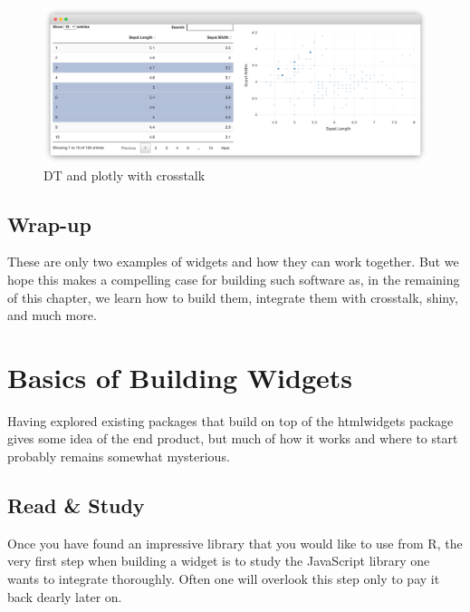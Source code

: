\documentclass[
]{krantz}
\begin{document}
\begin{figure}[t]

{\centering \includegraphics[width=1\linewidth]{images/dt-crosstalk-intro} 

}

\caption{DT and plotly with crosstalk}\label{fig:dt-example-crosstalk}
\end{figure}

\hypertarget{widgets-intro-conclude}{%
\section{Wrap-up}\label{widgets-intro-conclude}}

These are only two examples of widgets and how they can work together. But we hope this makes a compelling case for building such software as, in the remaining of this chapter, we learn how to build them, integrate them with crosstalk, shiny, and much more.

\hypertarget{widgets-basics}{%
\chapter{Basics of Building Widgets}\label{widgets-basics}}

Having explored existing packages that build on top of the htmlwidgets package gives some idea of the end product, but much of how it works and where to start probably remains somewhat mysterious.

\hypertarget{widgets-basics-study}{%
\section{Read \& Study}\label{widgets-basics-study}}

Once you have found an impressive library that you would like to use from R, the very first step when building a widget is to study the JavaScript library one wants to integrate thoroughly. Often one will overlook this step only to pay it back dearly later on.
\end{document}
